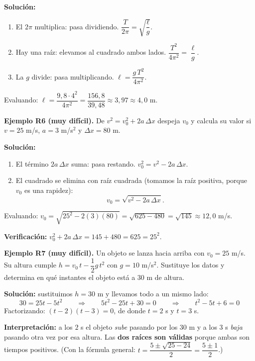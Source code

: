 \documentclass[12pt, letterpaper]{article}
\begin{document}
\begin{cuadrosolucion}
  \textbf{Solución:}
  \begin{enumerate}[leftmargin=*, label=\arabic*.]
    \item El $2\pi$ multiplica: pasa dividiendo. $\dfrac{T}{2\pi} = \sqrt{\dfrac{\ell}{g}}$.
    \item Hay una raíz: elevamos al cuadrado ambos lados. $\dfrac{T^2}{4\pi^2} = \dfrac{\ell}{g}$.
    \item La $g$ divide: pasa multiplicando. $\ell = \dfrac{g\,T^2}{4\pi^2}$.
  \end{enumerate}
  Evaluando: $\ell = \dfrac{9{,}8 \cdot 4^2}{4\pi^2} = \dfrac{156{,}8}{39{,}48} \approx 3{,}97 \approx 4{,}0$ m.
\end{cuadrosolucion}

\textbf{Ejemplo R6 (muy difícil).} De $v^2 = v_0^2 + 2a\,\Delta x$ despeja $v_0$ y calcula su valor si $v = 25$ m/s, $a = 3$ m/s$^2$ y $\Delta x = 80$ m.

\begin{cuadrosolucion}
  \textbf{Solución:}
  \begin{enumerate}[leftmargin=*, label=\arabic*.]
    \item El término $2a\,\Delta x$ suma: pasa restando. $v_0^2 = v^2 - 2a\,\Delta x$.
    \item El cuadrado se elimina con raíz cuadrada (tomamos la raíz positiva, porque $v_0$ es una rapidez):
          $$v_0 = \sqrt{v^2 - 2a\,\Delta x}.$$
  \end{enumerate}
  Evaluando: $v_0 = \sqrt{25^2 - 2(3)(80)} = \sqrt{625 - 480} = \sqrt{145} \approx 12{,}0$ m/s.

  \textbf{Verificación:} $v_0^2 + 2a\,\Delta x = 145 + 480 = 625 = 25^2$. \checkmark
\end{cuadrosolucion}

\textbf{Ejemplo R7 (muy difícil).} Un objeto se lanza hacia arriba con $v_0 = 25$ m/s. Su altura cumple $h = v_0\,t - \dfrac{1}{2}g\,t^2$ con $g = 10$ m/s$^2$. Sustituye los datos y determina en qué instantes el objeto está a $30$ m de altura.

\begin{cuadrosolucion}
  \textbf{Solución:} sustituimos $h = 30$ m y llevamos todo a un mismo lado:
  $$30 = 25t - 5t^2 \qquad \Longrightarrow \qquad 5t^2 - 25t + 30 = 0 \qquad \Longrightarrow \qquad t^2 - 5t + 6 = 0$$
  Factorizando: $(t - 2)(t - 3) = 0$, de donde $t = 2$ s y $t = 3$ s.

  \textbf{Interpretación:} a los $2$ s el objeto \emph{sube} pasando por los $30$ m y a los $3$ s \emph{baja} pasando otra vez por esa altura. Las \textbf{dos raíces son válidas} porque ambas son tiempos positivos. (Con la fórmula general: $t = \dfrac{5 \pm \sqrt{25 - 24}}{2} = \dfrac{5 \pm 1}{2}$.)
\end{cuadrosolucion}
\end{document}
